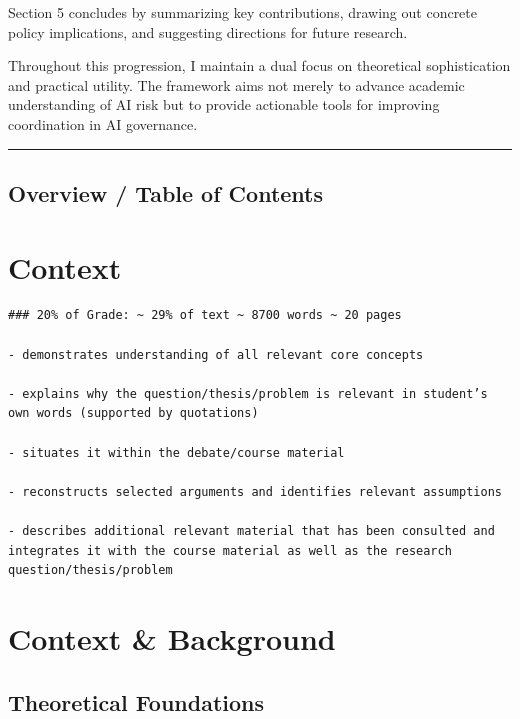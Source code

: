 \documentclass[
  11pt,
  letterpaper,
]{book}
\begin{document}
Section 5 concludes by summarizing key contributions, drawing out
concrete policy implications, and suggesting directions for future
research.

Throughout this progression, I maintain a dual focus on theoretical
sophistication and practical utility. The framework aims not merely to
advance academic understanding of AI risk but to provide actionable
tools for improving coordination in AI governance.

\begin{center}\rule{0.5\linewidth}{0.5pt}\end{center}

\section{Overview / Table of Contents}\label{overview-table-of-contents}


\chapter{Context}\label{context}

\begin{verbatim}
### 20% of Grade: ~ 29% of text ~ 8700 words ~ 20 pages

- demonstrates understanding of all relevant core concepts

- explains why the question/thesis/problem is relevant in student’s own words (supported by quotations)

- situates it within the debate/course material

- reconstructs selected arguments and identifies relevant assumptions

- describes additional relevant material that has been consulted and integrates it with the course material as well as the research question/thesis/problem
\end{verbatim}


\chapter{Context \& Background}\label{sec-context}

\section{Theoretical Foundations}\label{sec-theoretical-foundations}
\end{document}
